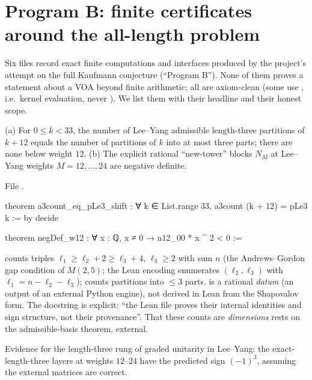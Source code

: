 \section{Program B: finite certificates around the all-length problem}\label{l19:sec:programb}

Six files record exact finite computations and interfaces produced by the project's attempt on the
full Kaufmann conjecture (``Program B''). None of them proves a statement about a VOA beyond finite
arithmetic; all are axiom-clean (some use , i.e.\ kernel evaluation, never
). We list them with their headline and their honest scope.

\begin{theorem}\label{l19:thm:len3}
(a) For $0\le k<33$, the number of Lee--Yang admissible length-three partitions of $k+12$ equals the number of
partitions of $k$ into at most three parts; there are none below weight $12$. (b) The explicit rational
``new-tower'' blocks $N_M$ at Lee--Yang weights $M = 12,\dots,24$ are negative definite.
\end{theorem}

\noindent File .
\begin{leancode}
theorem a3count_eq_pLe3_shift :
    ∀ k ∈ List.range 33, a3count (k + 12) = pLe3 k := by decide

theorem negDef_w12 : ∀ x : ℚ, x ≠ 0 → n12_00 * x ^ 2 < 0 :=
\end{leancode}

\begin{dictionary}
 counts triples $\ell_1\ge\ell_2+2\ge\ell_3+4$, $\ell_3\ge2$ with sum $n$ (the
Andrews--Gordon gap condition of $M(2,5)$; the Lean encoding enumerates $(\ell_2,\ell_3)$ with
$\ell_1 = n-\ell_2-\ell_3$);  counts partitions into $\le3$ parts.  is a rational
\emph{datum} (an output of an external Python engine), not derived in Lean from the Shapovalov form. The
docstring is explicit: ``the Lean file proves their internal identities and sign structure, not their
provenance''. That these counts are \emph{dimensions} rests on the admissible-basis theorem, external.
\end{dictionary}

\begin{physics}
Evidence for the length-three rung of graded unitarity in Lee--Yang: the exact-length-three layers at
weights $12$--$24$ have the predicted sign $(-1)^3$, assuming the external matrices are correct.
\end{physics}

